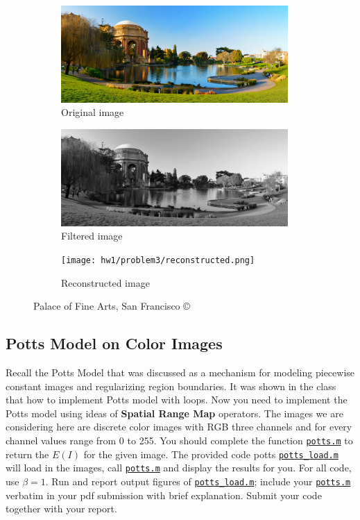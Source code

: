 \begin{figure}[htbp]
	\centering
	\begin{subfigure}[t]{\textwidth}
	    \centering
		\includegraphics[width=0.95\textwidth]{hw1/problem3/homepage.jpg}
		\caption{Original image}\label{fig:2a}
	\end{subfigure}
	\begin{subfigure}[t]{\textwidth}
	    \centering
		\includegraphics[width=0.95\textwidth]{hw1/problem3/gray.png}
        \caption{Filtered image}\label{fig:2b}
	\end{subfigure}
	\begin{subfigure}[t]{\textwidth}
	    \centering
		\texttt{[image: hw1/problem3/reconstructed.png]}
		\caption{Reconstructed image}\label{fig:2c}
	\end{subfigure}
	\caption{Palace of Fine Arts, San Francisco \copyright}\label{fig:2}
\end{figure}


\subsection{Potts Model on Color Images}
Recall the Potts Model that was discussed as a mechanism for modeling piecewise constant images and regularizing region boundaries.
It was shown in the class that how to implement Potts model with loops.
Now you need to implement the Potts model using ideas of \textbf{Spatial Range Map} operators.
The images we are considering here are discrete color images with RGB three channels and for every channel values range from 0 to 255.
You should complete the function \href{./hw1/problem4/potts.m}{\texttt{potts.m}} to return the \(E(I)\) for the given image.
The provided code potts \href{./hw1/problem4/potts_load.m}{\texttt{potts\_load.m}} will load in the images, call \href{./hw1/problem4/potts.m}{\texttt{potts.m}} and display the results for you.
For all code, use \(\beta=1\).
Run and report output figures of \href{./hw1/problem4/potts_load.m}{\texttt{potts\_load.m}}; include your \href{./hw1/problem4/potts.m}{\texttt{potts.m}} verbatim in your pdf submission with brief explanation.
Submit your code together with your report.

